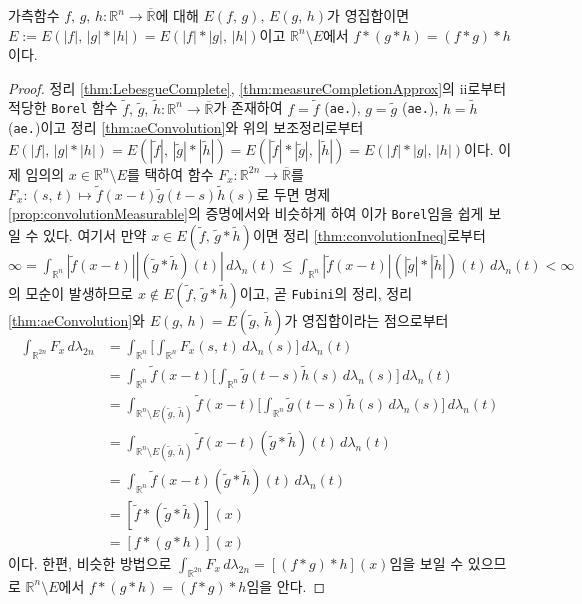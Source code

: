 \begin{theorem}\label{thm:convolutionAsscoi}
    가측함수 $f,\,g,\,h:\mathbb{R}^n\to\overline{\mathbb{R}}$에 대해 $E(f,\,g),\,E(g,\,h)$가 영집합이면 $E:=E(|f|,\,|g|*|h|)=E(|f|*|g|,\,|h|)$이고 $\mathbb{R}^n\setminus E$에서 $f*(g*h)=(f*g)*h$이다.
\end{theorem}

\begin{proof}
    정리 \ref{thm:LebesgueComplete}, \ref{thm:measureCompletionApprox}의 ii로부터 적당한 \texttt{Borel} 함수 $\widetilde{f},\,\widetilde{g},\,\widetilde{h}:\mathbb{R}^n\to\overline{\mathbb{R}}$가 존재하여 $f=\widetilde{f}$ (\texttt{ae.}), $g=\widetilde{g}$ (\texttt{ae.}), $h=\widetilde{h}$ (\texttt{ae.})이고 정리 \ref{thm:aeConvolution}와 위의 보조정리로부터 $E(|f|,\,|g|*|h|)=E(|\widetilde{f}|,\,|\widetilde{g}|*|\widetilde{h}|)=E(|\widetilde{f}|*|\widetilde{g}|,\,|\widetilde{h}|)=E(|f|*|g|,\,|h|)$이다. 이제 임의의 $x\in\mathbb{R}^n\setminus E$를 택하여 함수 $F_x:\mathbb{R}^{2n}\to\overline{\mathbb{R}}$를 $F_x:(s,\,t)\mapsto\widetilde{f}(x-t)\widetilde{g}(t-s)\widetilde{h}(s)$로 두면 명제 \ref{prop:convolutionMeasurable}의 증명에서와 비슷하게 하여 이가 \texttt{Borel}임을 쉽게 보일 수 있다. 여기서 만약 $x\in E(\widetilde{f},\,\widetilde{g}*\widetilde{h})$이면 정리 \ref{thm:convolutionIneq}로부터 $\infty=\int_{\mathbb{R}^n}|\widetilde{f}(x-t)||(\widetilde{g}*\widetilde{h})(t)|\,d\lambda_n(t)\leq\int_{\mathbb{R}^n}|\widetilde{f}(x-t)|(|\widetilde{g}|*|\widetilde{h}|)(t)\,d\lambda_n(t)<\infty$의 모순이 발생하므로 $x\notin E(\widetilde{f},\,\widetilde{g}*\widetilde{h})$이고, 곧 \texttt{Fubini}의 정리, 정리 \ref{thm:aeConvolution}와 $E(g,\,h)=E(\widetilde{g},\,\widetilde{h})$가 영집합이라는 점으로부터
    \begin{align*}
        \int_{\mathbb{R}^{2n}}F_x\,d\lambda_{2n}&=\int_{\mathbb{R}^n}\bigg[\int_{\mathbb{R}^n}F_x(s,\,t)\,d\lambda_n(s)\bigg]\,d\lambda_n(t)\\
        &=\int_{\mathbb{R}^n}\widetilde{f}(x-t)\bigg[\int_{\mathbb{R}^n}\widetilde{g}(t-s)\widetilde{h}(s)\,d\lambda_n(s)\bigg]\,d\lambda_n(t)\\
        &=\int_{\mathbb{R}^n\setminus E(\widetilde{g},\,\widetilde{h})}\widetilde{f}(x-t)\bigg[\int_{\mathbb{R}^n}\widetilde{g}(t-s)\widetilde{h}(s)\,d\lambda_n(s)\bigg]\,d\lambda_n(t)\\
        &=\int_{\mathbb{R}^n\setminus E(\widetilde{g},\,\widetilde{h})}\widetilde{f}(x-t)(\widetilde{g}*\widetilde{h})(t)\,d\lambda_n(t)\\
        &=\int_{\mathbb{R}^n}\widetilde{f}(x-t)(\widetilde{g}*\widetilde{h})(t)\,d\lambda_n(t)\\
        &=[\widetilde{f}*(\widetilde{g}*\widetilde{h})](x)\\
        &=[f*(g*h)](x)
    \end{align*}
    이다. 한편, 비슷한 방법으로 $\int_{\mathbb{R}^{2n}}F_x\,d\lambda_{2n}=[(f*g)*h](x)$임을 보일 수 있으므로 $\mathbb{R}^n\setminus E$에서 $f*(g*h)=(f*g)*h$임을 안다.
\end{proof}

